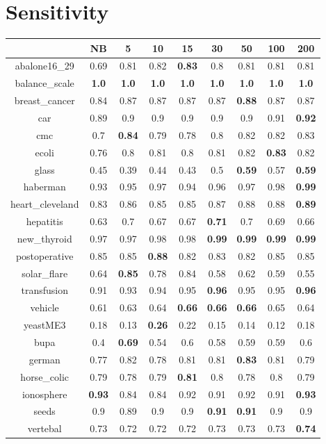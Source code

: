 \documentclass{article}%
\begin{document}
%
\section*{Sensitivity}%
\begin{tabular}{c|cccccccc}%
\hline%
&NB&5&10&15&30&50&100&200\\%
\hline%
abalone16\_29&0.69&0.81&0.82&\textbf{0.83}&0.8&0.81&0.81&0.81\\%
\hline%
balance\_scale&\textbf{1.0}&\textbf{1.0}&\textbf{1.0}&\textbf{1.0}&\textbf{1.0}&\textbf{1.0}&\textbf{1.0}&\textbf{1.0}\\%
\hline%
breast\_cancer&0.84&0.87&0.87&0.87&0.87&\textbf{0.88}&0.87&0.87\\%
\hline%
car&0.89&0.9&0.9&0.9&0.9&0.9&0.91&\textbf{0.92}\\%
\hline%
cmc&0.7&\textbf{0.84}&0.79&0.78&0.8&0.82&0.82&0.83\\%
\hline%
ecoli&0.76&0.8&0.81&0.8&0.81&0.82&\textbf{0.83}&0.82\\%
\hline%
glass&0.45&0.39&0.44&0.43&0.5&\textbf{0.59}&0.57&\textbf{0.59}\\%
\hline%
haberman&0.93&0.95&0.97&0.94&0.96&0.97&0.98&\textbf{0.99}\\%
\hline%
heart\_cleveland&0.83&0.86&0.85&0.85&0.87&0.88&0.88&\textbf{0.89}\\%
\hline%
hepatitis&0.63&0.7&0.67&0.67&\textbf{0.71}&0.7&0.69&0.66\\%
\hline%
new\_thyroid&0.97&0.97&0.98&0.98&\textbf{0.99}&\textbf{0.99}&\textbf{0.99}&\textbf{0.99}\\%
\hline%
postoperative&0.85&0.85&\textbf{0.88}&0.82&0.83&0.82&0.85&0.85\\%
\hline%
solar\_flare&0.64&\textbf{0.85}&0.78&0.84&0.58&0.62&0.59&0.55\\%
\hline%
transfusion&0.91&0.93&0.94&0.95&\textbf{0.96}&0.95&0.95&\textbf{0.96}\\%
\hline%
vehicle&0.61&0.63&0.64&\textbf{0.66}&\textbf{0.66}&\textbf{0.66}&0.65&0.64\\%
\hline%
yeastME3&0.18&0.13&\textbf{0.26}&0.22&0.15&0.14&0.12&0.18\\%
\hline%
bupa&0.4&\textbf{0.69}&0.54&0.6&0.58&0.59&0.59&0.6\\%
\hline%
german&0.77&0.82&0.78&0.81&0.81&\textbf{0.83}&0.81&0.79\\%
\hline%
horse\_colic&0.79&0.78&0.79&\textbf{0.81}&0.8&0.78&0.8&0.79\\%
\hline%
ionosphere&\textbf{0.93}&0.84&0.84&0.92&0.91&0.92&0.91&\textbf{0.93}\\%
\hline%
seeds&0.9&0.89&0.9&0.9&\textbf{0.91}&\textbf{0.91}&0.9&0.9\\%
\hline%
vertebal&0.73&0.72&0.72&0.72&0.73&0.73&0.73&\textbf{0.74}\\%
\hline%
\end{tabular}
\end{document}
